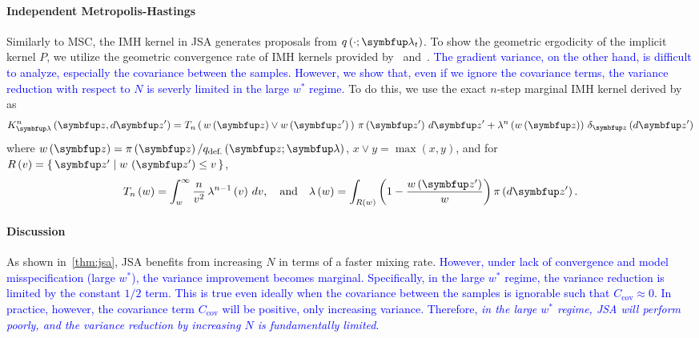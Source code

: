\paragraph{Independent Metropolis-Hastings}
Similarly to MSC, the IMH kernel in JSA generates proposals from \(q\left(\cdot; \vlambda_t\right)\).
To show the geometric ergodicity of the implicit kernel \(P\), we utilize the geometric convergence rate of IMH kernels provided by~\citet[Theorem 2.1]{10.2307/2242610} and~\citet{wang_exact_2020}.
\textcolor{blue}{
The gradient variance, on the other hand, is difficult to analyze, especially the covariance between the samples.
However, we show that, even if we ignore the covariance terms, the variance reduction with respect to \(N\) is severly limited in the large \(w^*\) regime.
}
To do this, we use the exact \(n\)-step marginal IMH kernel derived by~\citet{Smith96exacttransition} as
{
  \begin{align}
  K^n_{\vlambda}\left(\vz, d\vz^{\prime}\right) 
  = T_n\left(\, w\left(\vz\right) \vee w\left(\vz^{\prime}\right)\,\right) \, \pi\left(\vz^{\prime}\right) \, d\vz^{\prime}
  + \lambda^n\left(w\left(\vz\right)\right) \, \delta_{\vz}\left(d\vz^{\prime}\right)
  \label{eq:imh_exact_kernel}
  \end{align}
}%
where {\(w\left(\vz\right) = \pi\left(\vz\right)/q_{\text{def.}}\left(\vz; \vlambda\right)\), \(x \vee y = \max\left(x, y\right)\)}, and for {\(R\left(v\right) = \{\, \vz^{\prime} \mid w\,\left(\vz^{\prime}\right) \leq v \,\}\)}, 
{%
  \begin{align}
    T_n\left(w\right)      = \int_w^{\infty}
    \frac{n}{v^2}
    \, \lambda^{n-1}\left(v\right)\,dv,
    \quad\text{and}\quad
    \lambda\left(w\right) =
    \int_{R\left(w\right)}
    \left( 1 - \frac{w\left(\vz^{\prime}\right)}{w}  \right)
    \pi\left(d\vz^{\prime}\right).\label{eq:T_lambda}
  \end{align}
}%


%
\vspace{-1.5ex}
\paragraph{Discussion}
As shown in~\cref{thm:jsa}, JSA benefits from increasing \(N\) in terms of a faster mixing rate.
\textcolor{blue}{
However,  under lack of convergence and model misspecification (large \(w^*\)), the variance improvement becomes marginal.
Specifically, in the large \(w^*\) regime, the variance reduction is limited by the constant \(1/2\) term.
This is true even ideally when the covariance between the samples is ignorable such that \(C_{\text{cov}} \approx 0\).
In practice, however, the covariance term \(C_{\text{cov}}\) will be positive, only increasing variance.
Therefore, \textit{in the large \(w^*\) regime, JSA will perform poorly, and the variance reduction by increasing \(N\) is fundamentally limited}.
}

